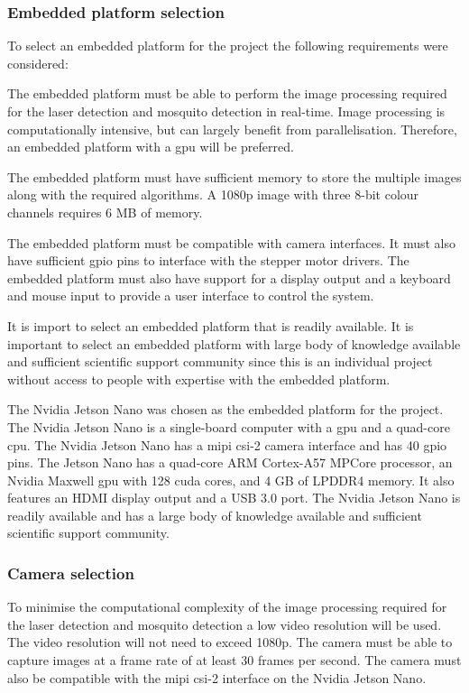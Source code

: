 \subsubsection{Embedded platform selection}
To select an embedded platform for the project the following requirements were considered:
\begin{description}[style=nextline]
  \item[Processing power] The embedded platform must be able to perform the image processing required for the laser detection and mosquito detection in real-time. Image processing is computationally intensive, but can largely benefit from parallelisation. Therefore, an embedded platform with a \gls{gpu} will be preferred.
  \item[Memory] The embedded platform must have sufficient memory to store the multiple images along with the required algorithms. A 1080p image with three 8-bit colour channels requires 6 MB of memory.
  \item[Hardware interfaces] The embedded platform must be compatible with camera interfaces. It must also have sufficient \gls{gpio} pins to interface with the stepper motor drivers. The embedded platform must also have support for a display output and a keyboard and mouse input to provide a user interface to control the system.
  \item[Availability and support] It is import to select an embedded platform that is readily available. It is important to select an embedded platform with large body of knowledge available and sufficient scientific support community since this is an individual project without access to people with expertise with the embedded platform.
\end{description}

The Nvidia Jetson Nano was chosen as the embedded platform for the project. The Nvidia Jetson Nano is a single-board computer with a \gls{gpu} and a quad-core \gls{cpu}. The Nvidia Jetson Nano has a \gls{mipi} \gls{csi}-2 camera interface and has 40 \gls{gpio} pins. The Jetson Nano has a quad-core ARM Cortex-A57 MPCore processor, an Nvidia Maxwell \gls{gpu} with 128 \gls{cuda} cores, and 4 GB of LPDDR4 memory. It also features an HDMI display output and a USB 3.0 port. The Nvidia Jetson Nano is readily available and has a large body of knowledge available and sufficient scientific support community.



\subsubsection{Camera selection}\label{subsubsec:camera_selection}
To minimise the computational complexity of the image processing required for the laser detection and mosquito detection a low video resolution will be used. The video resolution will not need to exceed 1080p. The camera must be able to capture images at a frame rate of at least 30 frames per second. The camera must also be compatible with the \gls{mipi} \gls{csi}-2 interface on the Nvidia Jetson Nano.

